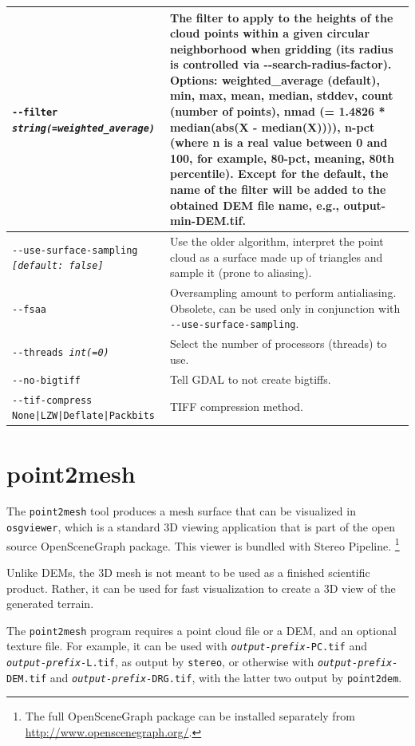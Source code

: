 \begin{longtable}{|p{8cm}|p{9cm}|}
\texttt{-\/-filter \textit{string(=weighted\_average)}} & The filter to apply to the heights of the cloud points within a given circular neighborhood when gridding (its radius is controlled via -\/-search-radius-factor). Options: weighted\_average (default), min, max, mean, median, stddev, count (number of points), nmad (= 1.4826 * median(abs(X - median(X)))), n-pct (where n is a real value between 0 and 100, for example, 80-pct, meaning, 80th percentile). Except for the default, the name of the filter will be added to the obtained DEM file name, e.g., output-min-DEM.tif.  \\
\hline

\texttt{-\/-use-surface-sampling \textit{[default: false]}} & Use the older algorithm, interpret the point cloud as a surface made up of triangles and sample it (prone to aliasing).\\ \hline
\texttt{-\/-fsaa} & Oversampling amount to perform antialiasing. Obsolete, can be used only in conjunction with \texttt{-\/-use-surface-sampling}. \\ \hline
\texttt{-\/-threads \textit{int(=0)}} & Select the number of processors (threads) to use.\\ \hline
\texttt{-\/-no-bigtiff} & Tell GDAL to not create bigtiffs.\\ \hline
\texttt{-\/-tif-compress None|LZW|Deflate|Packbits} & TIFF compression method.\\ \hline
\hline
\end{longtable}

\section{point2mesh}
\label{point2mesh}

The \texttt{point2mesh} tool produces a mesh surface that can be
visualized in {\tt osgviewer}, which is a standard 3D viewing
application that is part of the open source OpenSceneGraph package.
This viewer is bundled with Stereo Pipeline.
\footnote{The full OpenSceneGraph package can be installed
separately from \url{http://www.openscenegraph.org/}.}

Unlike \acp{DEM}, the 3D mesh is not meant to be used as a finished
scientific product.  Rather, it can be used for fast visualization
to create a 3D view of the generated terrain.

The \texttt{point2mesh} program requires a point cloud file
or a DEM, and an optional texture file.
For example, it can be used with \texttt{\textit{output-prefix}-PC.tif} and
\texttt{\textit{output-prefix}-L.tif}, as output by \texttt{stereo},
or otherwise with \texttt{\textit{output-prefix}-DEM.tif} and
\texttt{\textit{output-prefix}-DRG.tif}, with the latter two output
by \texttt{point2dem}.

